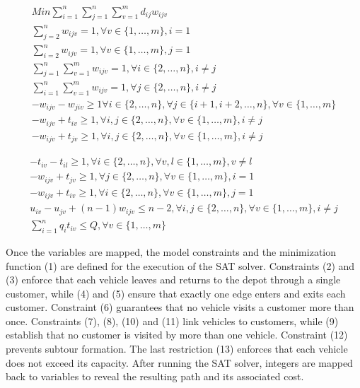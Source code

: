 \documentclass[10pt]{article}
\begin{document}
\begin{gather*}
M i n \sum_{i=1}^{n} \sum_{j=1}^{n} \sum_{v=1}^{m} d_{i j} w_{i j v}  \tag{1}\\
\sum_{j=2}^{n} w_{i j v}=1, \forall v \in\{1, \ldots, m\}, i=1  \tag{2}\\
\sum_{i=2}^{n} w_{i j v}=1, \forall v \in\{1, \ldots, m\}, j=1  \tag{3}\\
\sum_{j=1}^{n} \sum_{v=1}^{m} w_{i j v}=1, \forall i \in\{2, \ldots, n\}, i \neq j  \tag{4}\\
\sum_{i=1}^{n} \sum_{v=1}^{m} w_{i j v}=1, \forall j \in\{2, \ldots, n\}, i \neq j  \tag{5}\\
-w_{i j v}-w_{j i v} \geq 1 \forall i \in\{2, \ldots, n\}, \forall j \in\{i+1, i+2, \ldots, n\}, \forall v \in\{1, \ldots, m\}  \tag{6}\\
-w_{i j v}+t_{i v} \geq 1, \forall i, j \in\{2, \ldots, n\}, \forall v \in\{1, \ldots, m\}, i \neq j  \tag{7}\\
-w_{i j v}+t_{j v} \geq 1, \forall i, j \in\{2, \ldots, n\}, \forall v \in\{1, \ldots, m\}, i \neq j \tag{8}
\end{gather*}



\begin{gather*}
-t_{i v}-t_{i l} \geq 1, \forall i \in\{2, \ldots, n\}, \forall v, l \in\{1, \ldots, m\}, v \neq l  \tag{9}\\
-w_{i j v}+t_{j v} \geq 1, \forall j \in\{2, \ldots, n\}, \forall v \in\{1, \ldots, m\}, i=1  \tag{10}\\
-w_{i j v}+t_{i v} \geq 1, \forall i \in\{2, \ldots, n\}, \forall v \in\{1, \ldots, m\}, j=1  \tag{11}\\
u_{i v}-u_{j v}+(n-1) w_{i j v} \leq n-2, \forall i, j \in\{2, \ldots, n\}, \forall v \in\{1, \ldots, m\}, i \neq j  \tag{12}\\
\sum_{i=1}^{n} q_{i} t_{i v} \leq Q, \forall v \in\{1, \ldots, m\} \tag{13}
\end{gather*}


Once the variables are mapped, the model constraints and the minimization function (1) are defined for the execution of the SAT solver. Constraints (2) and (3) enforce that each vehicle leaves and returns to the depot through a single customer, while (4) and (5) ensure that exactly one edge enters and exits each customer. Constraint (6) guarantees that no vehicle visits a customer more than once. Constraints (7), (8), (10) and (11) link vehicles to customers, while (9) establish that no customer is visited by more than one vehicle. Constraint (12) prevents subtour formation. The last restriction (13) enforces that each vehicle does not exceed its capacity. After running the SAT solver, integers are mapped back to variables to reveal the resulting path and its associated cost.
\end{document}
